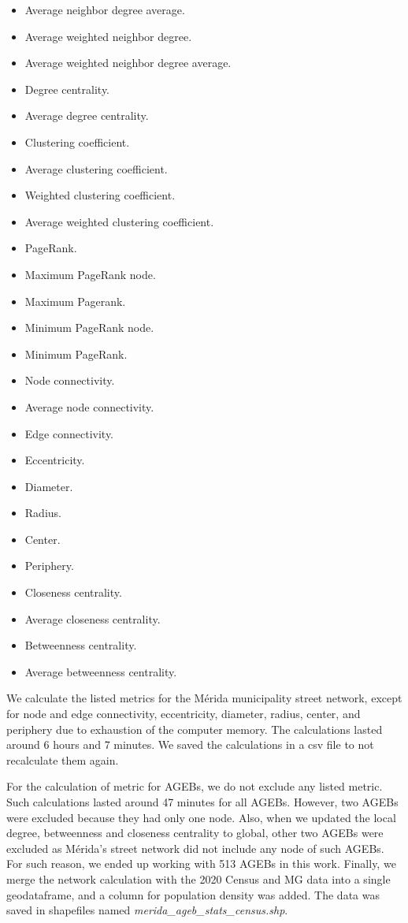 \begin{itemize}
	\item Average neighbor degree average.
	\item Average weighted neighbor degree.
	\item Average weighted neighbor degree average.
	\item Degree centrality.
	\item Average degree centrality.
	\item Clustering coefficient.
	\item Average clustering coefficient.
	\item Weighted clustering coefficient.
	\item Average weighted clustering coefficient.
	\item PageRank.
	\item Maximum PageRank node.
	\item Maximum Pagerank.
	\item Minimum PageRank node.
	\item Minimum PageRank.
	\item Node connectivity.
	\item Average node connectivity.
	\item Edge connectivity.
	\item Eccentricity.
	\item Diameter.
	\item Radius.
	\item Center.
	\item Periphery.
	\item Closeness centrality.
	\item Average closeness centrality.
	\item Betweenness centrality.
	\item Average betweenness centrality.
\end{itemize}

We calculate the listed metrics for the Mérida municipality street network, except for node and edge connectivity, eccentricity, diameter, radius, center, and periphery due to exhaustion of the computer memory. The calculations lasted around 6 hours and 7 minutes. We saved the calculations in a csv file to not recalculate them again.

For the calculation of metric for AGEBs, we do not exclude any listed metric. Such calculations lasted around 47 minutes for all AGEBs. However, two AGEBs were excluded because they had only one node. Also, when we updated the local degree, betweenness and closeness centrality to global, other two AGEBs were excluded as Mérida's street network did not include any node of such AGEBs. For such reason, we ended up working with 513 AGEBs in this work. Finally, we merge the network calculation with the 2020 Census and MG data into a single geodataframe, and a column for population density was added. The data was saved in shapefiles named \textit{merida\_ageb\_stats\_census.shp}.

